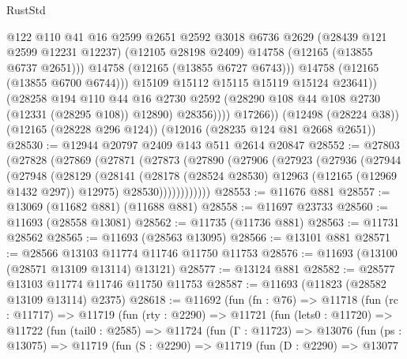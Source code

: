 \begin{lexlean}{RustStd}
\begin{coremodule}
                        @122
                        @110
                        @41
                        @16
                        @2599
                        @2651
                        @2592
                        @3018
                        @6736
                        @2629
                        (@28439 @121 @2599 @12231 @12237)
                        (@12105 @28198 @2409)
                        @14758
                        (@12165 (@13855 @6737 @2651)))
                      @14758
                      (@12165 (@13855 @6727 @6743)))
                    @14758
                    (@12165 (@13855 @6700 @6744)))
                  @15109
                  @15112
                  @15115
                  @15119
                  @15124
                  @23641))
              (@28258
                @194
                @110
                @44
                @16
                @2730
                @2592
                (@28290 @108 @44 @108 @2730 (@12331 (@28295 @108)) @12890)
                @28356))))
        @17266))
    (@12498 (@28224 @38))
    (@12165 (@28228 @296 @124))
    (@12016 (@28235 @124 @81 @2668 @2651))
@28530 := @12944 @20797 @2409 @143 @511 @2614 @20847
@28552 := @27803
    (@27828
      (@27869
        (@27871
          (@27873
            (@27890
              (@27906
                (@27923
                  (@27936
                    (@27944
                      (@27948
                        (@28129
                          (@28141
                            (@28178 (@28524 @28530) @12963 (@12165 (@12969 @1432 @297)) @12975)
                            @28530))))))))))))
@28553 := @11676 @881
@28557 := @13069 (@11682 @881) (@11688 @881)
@28558 := @11697 @23733
@28560 := @11693 (@28558 @13081)
@28562 := @11735 (@11736 @881)
@28563 := @11731 @28562
@28565 := @11693 (@28563 @13095)
@28566 := @13101 @881
@28571 := @28566 @13103 @11774 @11746 @11750 @11753
@28576 := @11693 (@13100 (@28571 @13109 @13114) @13121)
@28577 := @13124 @881
@28582 := @28577 @13103 @11774 @11746 @11750 @11753
@28587 := @11693 (@11823 (@28582 @13109 @13114) @2375)
@28618 := @11692
    (fun (fn : @76) =>
    @11718
      (fun (rc : @11717) =>
      @11719
        (fun (rty : @2290) =>
        @11721
          (fun (lets0 : @11720) =>
          @11722
            (fun (tail0 : @2585) =>
            @11724
              (fun (Γ : @11723) =>
              @13076
                (fun (ps : @13075) =>
                @11719
                  (fun (S : @2290) =>
                  @11719
                    (fun (D : @2290) =>
                    @13077

\end{coremodule}
\end{lexlean}
